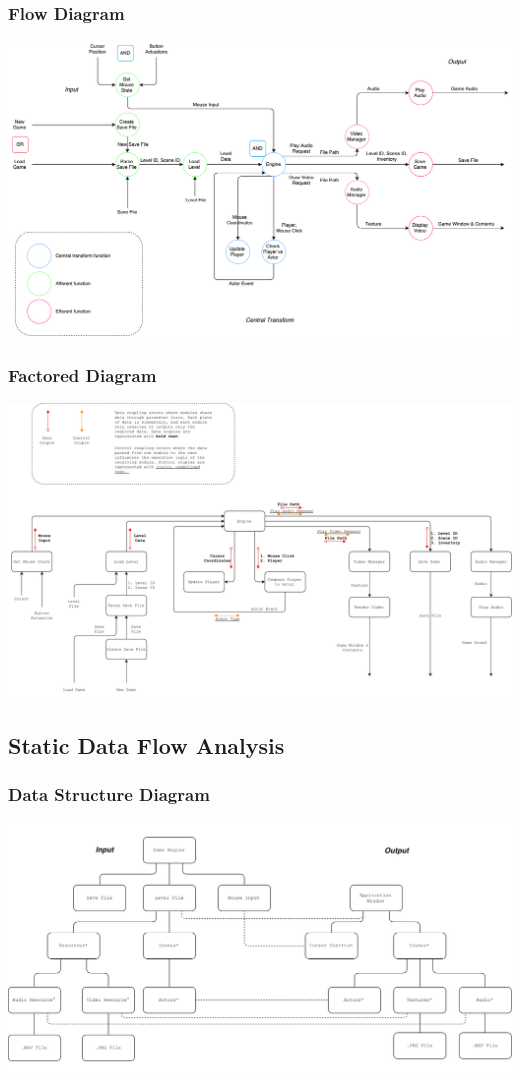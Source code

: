 \documentclass{article}
\begin{document}
		\subsubsection{Flow Diagram}
			\begin{center}
				\includegraphics[scale=0.30]{ddfFlow}
			\end{center}
		\subsubsection{Factored Diagram}
			\begin{center}
				\includegraphics[scale=0.30]{ddfFactored}
			\end{center}
	\subsection{Static Data Flow Analysis}
		\subsubsection{Data Structure Diagram}
			\begin{center}
				\includegraphics[scale=0.4]{jackson1}
			\end{center}
\end{document}
